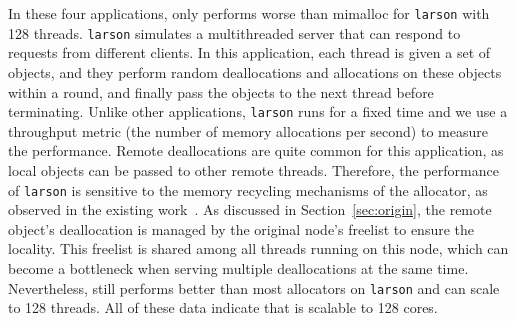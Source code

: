 In these four applications, \NM{} only performs worse than mimalloc for \texttt{larson} with 128 threads. \texttt{larson} simulates a multithreaded server that can respond to requests from different clients. In this application, each thread is given a set of objects, and they perform random deallocations and allocations on these objects within a round, and finally pass the objects to the next thread before terminating. Unlike other applications, \texttt{larson} runs for a fixed time and we use a throughput metric (the number of memory allocations per second) to measure the performance. Remote deallocations are quite common for this application, as local objects can be passed to other remote threads. Therefore, the performance of \texttt{larson} is sensitive to the memory recycling mechanisms of the allocator, as observed in the existing work~\cite{Scalloc, scalableallocator}. As discussed in Section~\ref{sec:origin}, the remote object's deallocation is managed by the original node's freelist to ensure the locality. This freelist is shared among all threads running on this node, which can become a bottleneck when serving multiple deallocations at the same time. Nevertheless, \NM{} still performs better than most allocators on \texttt{larson} and can scale to 128 threads.
All of these data indicate that \NM{} is scalable to 128 cores. 




